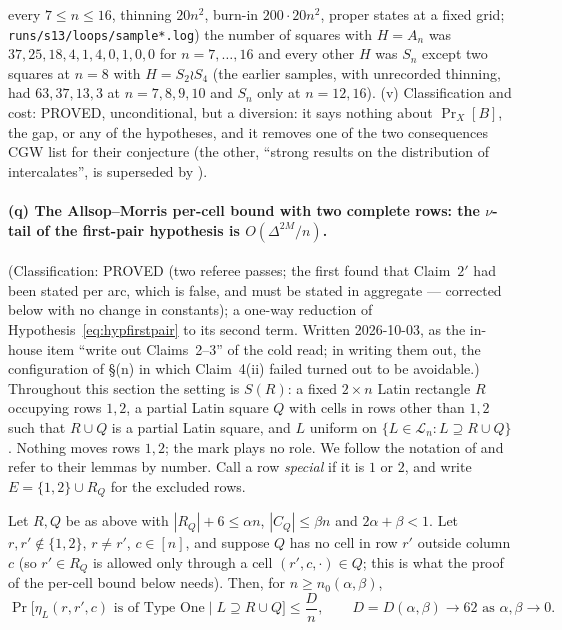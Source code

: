 every $7\le n\le16$, thinning $20n^2$, burn-in $200\cdot20n^2$, proper
states at a fixed grid; \texttt{runs/s13/loops/sample*.log}) the
number of squares with $H=A_n$ was $37,25,18,4,1,4,0,1,0,0$ for
$n=7,\dots,16$ and every other $H$ was $S_n$ except two squares at
$n=8$ with $H=S_2\wr S_4$ (the earlier samples, with unrecorded
thinning, had $63,37,13,3$ at $n=7,8,9,10$ and $S_n$ only at $n=12,16$).  (v) Classification and cost: PROVED, unconditional, but a
diversion: it says nothing about $\Pr_X[B]$, the gap, or any of the
hypotheses, and it removes one of the two consequences CGW list for
their conjecture (the other, ``strong results on the distribution of
intercalates'', is superseded by \cite{KS18,KSS21}).

\paragraph{(q) The Allsop--Morris per-cell bound with two complete rows:
the $\nu$-tail of the first-pair hypothesis is $O(\Delta^{2M}/n)$.}
(Classification: PROVED (two referee passes; the first found that
Claim~$2'$ had been stated per arc, which is false, and must be stated
in aggregate --- corrected below with no change in constants); a
one-way reduction of Hypothesis~\eqref{eq:hypfirstpair} to its second
term.  Written 2026-10-03, as the in-house item ``write out Claims~2--3''
of the cold read; in writing them out, the configuration of \S(n) in
which Claim~4(ii) failed turned out to be avoidable.)  Throughout this
section the setting is $S(R)$: a fixed $2\times n$ Latin rectangle $R$
occupying rows $1,2$, a partial Latin square $Q$ with cells in rows
other than $1,2$ such that $R\cup Q$ is a partial Latin square, and $L$
uniform on $\{L\in\mathcal L_n: L\supseteq R\cup Q\}$.  Nothing moves
rows $1,2$; the mark plays no role.  We follow the notation of
\cite[\S\S2--4]{AM26} and refer to their lemmas by number.  Call a row
\emph{special} if it is $1$ or $2$, and write
$E=\{1,2\}\cup R_Q$ for the excluded rows.

\begin{theorem}\label{thm:AM31two}
Let $R,Q$ be as above with $|R_Q|+6\le\alpha n$, $|C_Q|\le\beta n$ and
$2\alpha+\beta<1$.  Let $r,r'\notin\{1,2\}$, $r\ne r'$, $c\in[n]$, and
suppose $Q$ has no cell in row $r'$ outside column $c$ (so $r'\in R_Q$
is allowed only through a cell $(r',c,\cdot)\in Q$; this is what the
proof of the per-cell bound below needs).  Then, for
$n\ge n_0(\alpha,\beta)$,
\[
\Pr\bigl[\eta_L(r,r',c)\text{ is of Type One}\;\big|\;L\supseteq R\cup Q\bigr]\le\frac{D}{n},
\qquad D=D(\alpha,\beta)\to62\text{ as }\alpha,\beta\to0 .
\]
\end{theorem}

